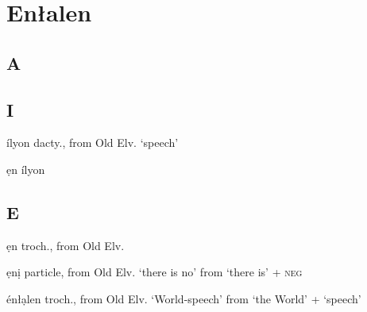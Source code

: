\chapter{En\l alen}

\begin{multicols*}{2}

\section{A}

\section{I}

\begin{entrylist}
    \begin{dictentry}{ílyon}{
        dacty., from Old Elv.  `speech'
    }\label{enl:ilyon_HM}
        \begin{entrysublist}
            \begin{dictentry}{ẹn ílyon}{}\label{enl:en_L_ilyon_HM}
            \end{dictentry}
        \end{entrysublist}
    \end{dictentry}
\end{entrylist}

\section{E}

\begin{entrylist}
    \begin{dictentry}{ẹn}{
        troch., from Old Elv. 
    }\label{enl:en_L}
    \end{dictentry}
    \begin{dictentry}{ẹnị}{
        particle, from Old Elv.  `there is no' from  `there is' +  \textsc{neg}
    }\label{enl:eni_LL}
    \end{dictentry}
    \begin{dictentry}{énłạlen}{
        troch., from Old Elv.  `World-speech' from  `the World' +  `speech'
        }
        \label{enl:enLalen_HLM}
    \end{dictentry}
\end{entrylist}


\end{multicols*}
